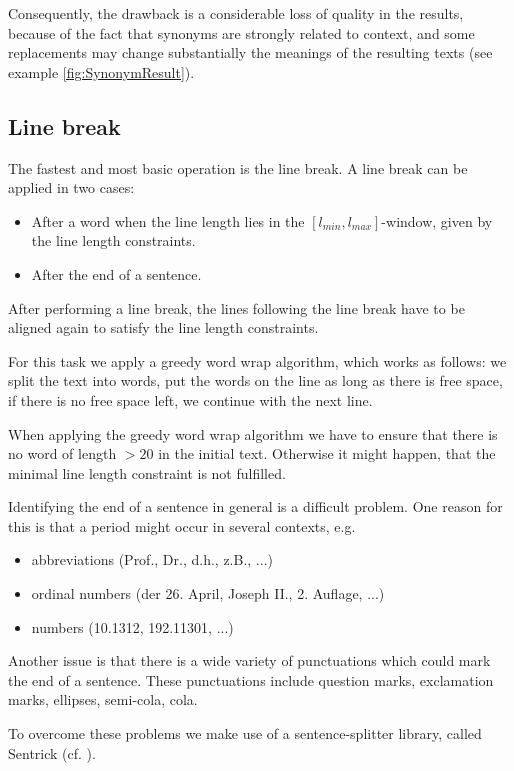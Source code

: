 \documentclass[11pt]{reportAlternative}
\begin{document}
Consequently, the drawback is a considerable loss of quality in the results, because of the fact that synonyms are strongly related to context, and some replacements may change substantially the meanings of the resulting texts (see example \ref{fig:SynonymResult}).

\subsection{Line break}
The fastest and most basic operation is the line break. A line break can be applied in two cases:

\begin{itemize}
	\item After a word when the line length lies in the $[l_{min},l_{max}]$-window,
	given by the line length constraints.
	\item After the end of a sentence.
\end{itemize}
After performing a line break, the lines following the line break have
to be aligned again to satisfy the line length constraints.

For this task we apply a greedy word wrap algorithm, which works as follows: we split the text into words,
put the words on the line as long as there is free space, if there is no free space left, we continue with the next line.

When applying the greedy word wrap algorithm we have to ensure that
there is no word of length $> 20$ in the initial text. Otherwise it might happen, that the minimal line
length constraint is not fulfilled.

Identifying the end of a sentence in general is a difficult problem. One reason for this is that a period
might occur in several contexts, e.g.

\begin{itemize}

	\item abbreviations (Prof., Dr., d.h., z.B., ...)
	\item ordinal numbers (der 26. April, Joseph II., 2. Auflage, ...)
	\item numbers (10.1312, 192.11301, ...)

\end{itemize}

Another issue is that there is a wide variety of punctuations which could mark the end of a sentence. These punctuations include question marks, exclamation marks, ellipses, semi-cola, cola.

To overcome these problems we make use of a sentence-splitter library, called Sentrick (cf. \cite{Sentrick}).
\end{document}
